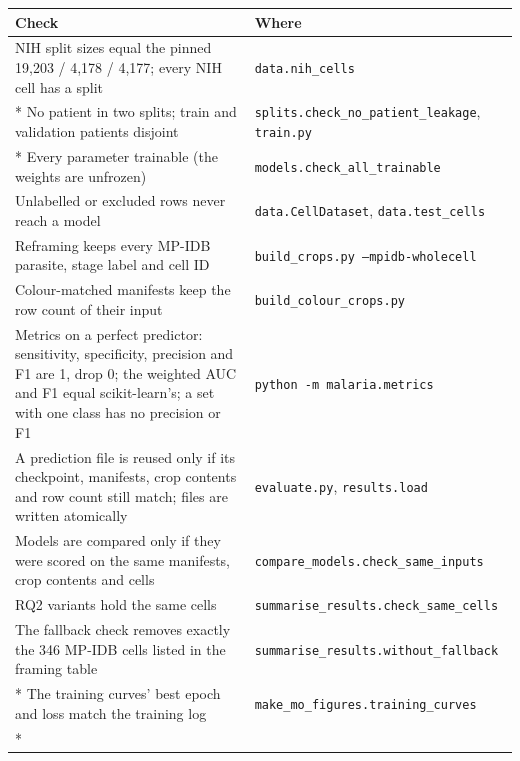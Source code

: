 \documentclass[11pt,a4paper]{article}
\begin{document}
{\small
\begin{longtable}{@{}>{\raggedright\arraybackslash\hspace{0pt}}p{241.1pt}>{\raggedright\arraybackslash\hspace{0pt}}p{94.9pt}@{}}
\toprule
Check & Where \\
\midrule
\endhead
\bottomrule
\endfoot
\bottomrule
\endlastfoot
NIH split sizes equal the pinned 19,203 / 4,178 / 4,177; every NIH cell has a split & \texttt{data.\allowbreak{}nih\_\allowbreak{}cells} \\*
No patient in two splits; train and validation patients disjoint & \texttt{splits.\allowbreak{}check\_\allowbreak{}no\_\allowbreak{}patient\_\allowbreak{}leakage}, \texttt{train.\allowbreak{}py} \\*
Every parameter trainable (the weights are unfrozen) & \texttt{models.\allowbreak{}check\_\allowbreak{}all\_\allowbreak{}trainable} \\
Unlabelled or excluded rows never reach a model & \texttt{data.\allowbreak{}CellDataset}, \texttt{data.\allowbreak{}test\_\allowbreak{}cells} \\
Reframing keeps every MP-IDB parasite, stage label and cell ID & \texttt{build\_\allowbreak{}crops.\allowbreak{}py --mpidb-wholecell} \\
Colour-matched manifests keep the row count of their input & \texttt{build\_\allowbreak{}colour\_\allowbreak{}crops.\allowbreak{}py} \\
Metrics on a perfect predictor: sensitivity, specificity, precision and F1 are 1, drop 0; the weighted AUC and F1 equal scikit-learn's; a set with one class has no precision or F1 & \texttt{python -m malaria.\allowbreak{}metrics} \\
A prediction file is reused only if its checkpoint, manifests, crop contents and row count still match; files are written atomically & \texttt{evaluate.\allowbreak{}py}, \texttt{results.\allowbreak{}load} \\
Models are compared only if they were scored on the same manifests, crop contents and cells & \texttt{compare\_\allowbreak{}models.\allowbreak{}check\_\allowbreak{}same\_\allowbreak{}inputs} \\
RQ2 variants hold the same cells & \texttt{summarise\_\allowbreak{}results.\allowbreak{}check\_\allowbreak{}same\_\allowbreak{}cells} \\
The fallback check removes exactly the 346 MP-IDB cells listed in the framing table & \texttt{summarise\_\allowbreak{}results.\allowbreak{}without\_\allowbreak{}fallback} \\*
The training curves' best epoch and loss match the training log & \texttt{make\_\allowbreak{}mo\_\allowbreak{}figures.\allowbreak{}training\_\allowbreak{}curves} \\*
\end{longtable}}
\addtocounter{table}{-1}
\end{document}
